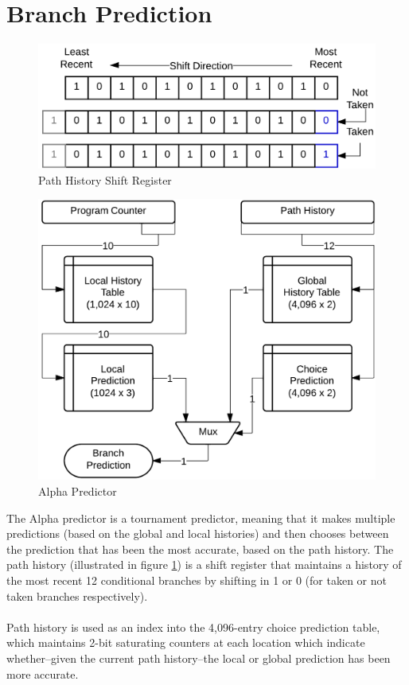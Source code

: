 \documentclass[twocolumn]{article}
\newcommand{\centerimage}[3]{
\begin{figure}[ht!]  
\begin{center} #1
\caption{#2}
\label{#3}
\end{center}
\end{figure}}
\begin{document}
\section{Branch Prediction}\centerimage{\includegraphics[width=\columnwidth]{img/phistory.png}}{Path History Shift Register}{phistory}\centerimage{\includegraphics[width=\columnwidth]{img/alpha.png}}{Alpha Predictor}{alpha}
The Alpha predictor is a tournament predictor, meaning that it makes multiple predictions (based on the global and local histories) and then chooses between the prediction that has  been the most accurate, based on the path history.  The path history (illustrated in figure \ref{phistory}) is a shift register that maintains a history of the most recent 12 conditional branches by shifting in 1 or 0 (for taken or not taken branches respectively).\\\\
Path history is used as an index into the 4,096-entry choice prediction table, which maintains 2-bit saturating counters at each location which indicate whether--given the current path history--the local or global prediction has been more accurate.\\\\  
\end{document}
